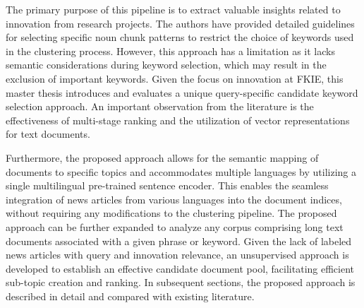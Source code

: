 The primary purpose of this pipeline is to extract valuable insights related to innovation from research projects. The authors have provided detailed guidelines for selecting specific noun chunk patterns to restrict the choice of keywords used in the clustering process. However, this approach has a limitation as it lacks semantic considerations during keyword selection, which may result in the exclusion of important keywords. Given the focus on innovation at \ac{FKIE}, this master thesis introduces and evaluates a unique query-specific candidate keyword selection approach. An important observation from the literature is the effectiveness of multi-stage ranking and the utilization of vector representations for text documents.

Furthermore, the proposed approach allows for the semantic mapping of documents to specific topics and accommodates multiple languages by utilizing a single multilingual pre-trained sentence encoder. This enables the seamless integration of news articles from various languages into the document indices, without requiring any modifications to the clustering pipeline. The proposed approach can be further expanded to analyze any corpus comprising long text documents associated with a given phrase or keyword. Given the lack of labeled news articles with query and innovation relevance, an unsupervised approach is developed to establish an effective candidate document pool, facilitating efficient sub-topic creation and ranking. In subsequent sections, the proposed approach is described in detail and compared with existing literature.
